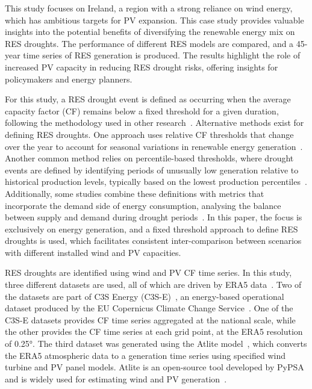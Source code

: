 \documentclass[a4paper, 11pt]{article}
\begin{document}
This study focuses on Ireland, a region with a strong reliance on wind energy, which has ambitious targets for PV expansion. This case study provides valuable insights into the potential benefits of diversifying the renewable energy mix on RES droughts. The performance of different RES models are compared, and a 45-year time series of RES generation is produced. The results highlight the role of increased PV capacity in reducing RES drought risks, offering insights for policymakers and energy planners.

For this study, a RES drought event is defined as occurring when the average capacity factor (CF) remains below a fixed threshold for a given duration, following the methodology used in other research~\cite{kaspar2019drought, ohba2022drought, mockert2023drought, mayer2023drought}. Alternative methods exist for defining RES droughts. One approach uses relative CF thresholds that change over the year to account for seasonal variations in renewable energy generation~\cite{raynaud2018drought, rinaldi2021drought, gangopadhyay2022drought, allen2023drought, kapica2024drought}. Another common method relies on percentile-based thresholds, where drought events are defined by identifying periods of unusually low generation relative to historical production levels, typically based on the lowest production percentiles~\cite{bracken2024drought, allen2023drought}. Additionally, some studies combine these definitions with metrics that incorporate the demand side of energy consumption, analysing the balance between supply and demand during drought periods~\cite{raynaud2018drought, rinaldi2021drought, allen2023drought, bracken2024drought}. In this paper, the focus is exclusively on energy generation, and a fixed threshold approach to define RES droughts is used, which facilitates consistent inter-comparison between scenarios with different installed wind and PV capacities.

RES droughts are identified using wind and PV CF time series. In this study, three different datasets are used, all of which are driven by ERA5 data~\cite{hersbach2020era5}. Two of the datasets are part of C3S Energy (C3S-E)~\cite{cds2023energy}, an energy-based operational dataset produced by the EU Copernicus Climate Change Service~\cite{dubus2023energy}. One of the C3S-E datasets provides CF time series aggregated at the national scale, while the other provides the CF time series at each grid point, at the ERA5 resolution of 0.25°. The third dataset was generated using the Atlite model~\cite{hofman2021atlite}, which converts the ERA5 atmospheric data to a generation time series using specified wind turbine and PV panel models. Atlite is an open-source tool developed by PyPSA~\cite{hofman2021atlite} and is widely used for estimating wind and PV generation~\cite{mockert2023drought, li2023atlite, parzen2023atlite, ali2023comparative}.
\end{document}
